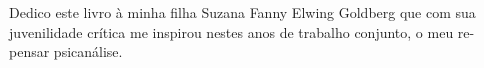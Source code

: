 \begingroup
\ifodd\thepage\relax\else\cleardoublepage\fi

\thispagestyle{empty}
\vspace*{.6\textheight}
\parindent0pt
\parskip6pt


\hfill\begin{minipage}{.7\textwidth}
Dedico este livro à minha filha Suzana Fanny Elwing Goldberg que com
sua juvenilidade crítica me inspirou nestes anos de trabalho conjunto, o
meu re-pensar psicanálise.
\end{minipage}

\endgroup
